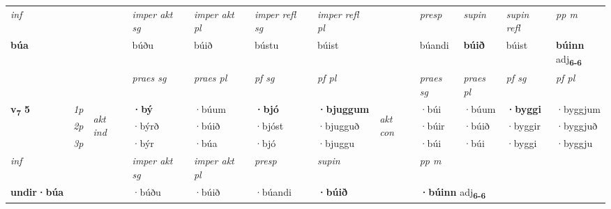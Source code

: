 \begin{longtable}[l]{X>{\footnotesize\itshape}llXXXXlXXXX}
   {\textit{inf}} & &  & \textit{imper akt sg} & \textit{imper akt pl} & \textit{imper refl sg} & \textit{imper refl pl} && \textit{presp} & \textit{supin} & \textit{supin refl} & \textit{pp m} \\*
  {\textbf{búa}} & && búðu  & búið & bústu & búist && búandi &  \textbf{búið} & búist & \specialcell{\textbf{búinn} \\ adj\textbf{\textsubscript{6-6}}} \\*

\midrule

 & &   & \textit{praes sg}  & \textit{praes pl}    & \textit{ pf sg} & \textit{pf pl} & & \textit{praes sg}  & \textit{praes pl}    & \textit{pf sg} & \textit{pf pl }  \\ \cmidrule{4-7} \cmidrule{9-12}
 \multirow{2}{*}{{{\textbf{v{\textsubscript{7}}} \Large{\textbf{5}}}}}  & 1p & \multirow{3}{*}{\begin{turn}{90}\textit{akt ind}\end{turn}} & \textbf{·bý} & ·búum & \textbf{·bjó} & \textbf{·bjuggum} & \multirow{3}{*}{\begin{turn}{90}\textit{akt con}\end{turn}} &·búi & ·búum & \textbf{·byggi} & ·byggjum\\*
 & 2p &  &  ·býrð  & ·búið & ·bjóst & ·bjugguð & & ·búir & ·búið & ·byggir & ·byggjuð \\*
 & 3p &  & ·býr & ·búa & ·bjó & ·bjuggu & & ·búi & ·búi& ·byggi & ·byggju \\*
\cmidrule{4-7} \cmidrule{9-12}

   {\textit{inf}} & &  & \textit{imper akt sg} & \textit{imper akt pl}   & \textit{presp} & \textit{supin}  && \textit{pp m} \\*
  {\textbf{undir\allowbreak ·búa}} & && ·búðu  & ·búið   & ·búandi &  \textbf{·búið}  && \multicolumn{2}{l}{\textbf{·búinn} adj\textbf{\textsubscript{6-6}}} \\*

\midrule


\end{longtable}
